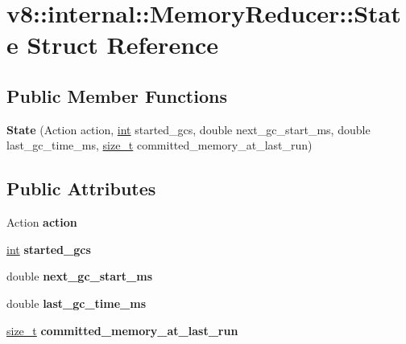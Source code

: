 \hypertarget{structv8_1_1internal_1_1MemoryReducer_1_1State}{}\section{v8\+:\+:internal\+:\+:Memory\+Reducer\+:\+:State Struct Reference}
\label{structv8_1_1internal_1_1MemoryReducer_1_1State}
\subsection*{Public Member Functions}
\begin{DoxyCompactItemize}
\item 
\mbox{\label{structv8_1_1internal_1_1MemoryReducer_1_1State_a3e560f2a6fc534398f0dbb099b859d05}} 
{\bfseries State} (Action action, \mbox{\hyperlink{classint}{int}} started\+\_\+gcs, double next\+\_\+gc\+\_\+start\+\_\+ms, double last\+\_\+gc\+\_\+time\+\_\+ms, \mbox{\hyperlink{classsize__t}{size\+\_\+t}} committed\+\_\+memory\+\_\+at\+\_\+last\+\_\+run)
\end{DoxyCompactItemize}
\subsection*{Public Attributes}
\begin{DoxyCompactItemize}
\item 
\mbox{\label{structv8_1_1internal_1_1MemoryReducer_1_1State_a6b6cb0e440ba7d62ee09acf63b455a0c}} 
Action {\bfseries action}
\item 
\mbox{\label{structv8_1_1internal_1_1MemoryReducer_1_1State_a5de0dc251ae3308b6d54763f0c56402f}} 
\mbox{\hyperlink{classint}{int}} {\bfseries started\+\_\+gcs}
\item 
\mbox{\label{structv8_1_1internal_1_1MemoryReducer_1_1State_a390c46d6d670e8b8302d4ff1d2486c63}} 
double {\bfseries next\+\_\+gc\+\_\+start\+\_\+ms}
\item 
\mbox{\label{structv8_1_1internal_1_1MemoryReducer_1_1State_aa28e5fde718c13fe4ad203bd370f3de5}} 
double {\bfseries last\+\_\+gc\+\_\+time\+\_\+ms}
\item 
\mbox{\label{structv8_1_1internal_1_1MemoryReducer_1_1State_abd550caa9724fbe40b3aa7e050b3139d}} 
\mbox{\hyperlink{classsize__t}{size\+\_\+t}} {\bfseries committed\+\_\+memory\+\_\+at\+\_\+last\+\_\+run}
\end{DoxyCompactItemize}


